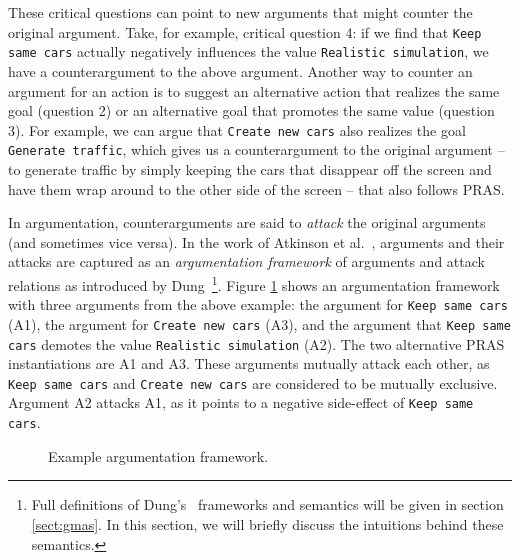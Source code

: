 These critical questions can point to new arguments that might counter the original argument. Take, for example, critical question 4: if we find that  \texttt{Keep same cars} actually negatively influences the value  \texttt{Realistic simulation}, we have a counterargument to the above argument.  %
Another way to counter an argument for an action is to suggest an alternative action that realizes the same goal (question 2) or an alternative goal that promotes the same value (question 3). For example, we can argue that  \texttt{Create new cars} also realizes the goal  \texttt{Generate traffic}, %
which gives us a counterargument to the original argument -- to generate traffic by simply keeping the cars that disappear off the screen and have them wrap around to the other side of the screen -- that also follows PRAS. %

In argumentation, counterarguments are said to \emph{attack} the original arguments (and sometimes vice versa). In the work of Atkinson et al.~\cite{atkinson2007}, arguments and their attacks are captured as an \emph{argumentation framework} of arguments and attack relations as introduced by Dung~\cite{Dung1995}\footnote{Full definitions of Dung's~\cite{Dung1995} frameworks and semantics will be given in section \ref{sect:gmas}. In this section, we will briefly discuss the intuitions behind these semantics.}. Figure \ref{fig:pras:example} shows an argumentation framework with three arguments from the above example: the argument for  \texttt{Keep same cars} (A1), the argument for \texttt{Create new cars} (A3), and the argument that \texttt{Keep same cars} demotes the value  \texttt{Realistic simulation} (A2). The two alternative PRAS instantiations are A1 and A3. These arguments mutually attack each other, as \texttt{Keep same cars}  and \texttt{Create new cars} are considered to be mutually exclusive. Argument A2 attacks A1, as it points to a negative side-effect of \texttt{Keep same cars}. %

\begin{figure}[ht!]
\centering
{}
\caption{Example argumentation framework.}
\label{fig:pras:example}
\end{figure}

